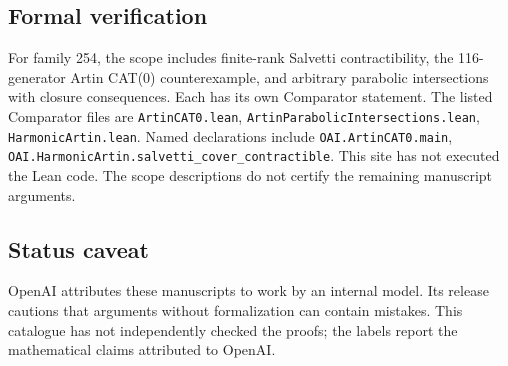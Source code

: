 \documentclass[11pt]{article}
\begin{document}
\subsection{Formal verification}
For family 254, the scope includes finite-rank Salvetti contractibility, the 116-generator Artin CAT(0) counterexample, and arbitrary parabolic intersections with closure consequences. Each has its own Comparator statement. The listed Comparator files are \texttt{ArtinCAT0.lean}, \texttt{ArtinParabolicIntersections.lean}, \texttt{HarmonicArtin.lean}. Named declarations include \texttt{OAI.ArtinCAT0.main}, \texttt{OAI.HarmonicArtin.salvetti\_cover\_contractible}. This site has not executed the Lean code. The scope descriptions do not certify the remaining manuscript arguments.

\subsection{Status caveat}
OpenAI attributes these manuscripts to work by an internal model. Its release cautions that arguments without formalization can contain mistakes. This catalogue has not independently checked the proofs; the labels report the mathematical claims attributed to OpenAI.
\end{document}

